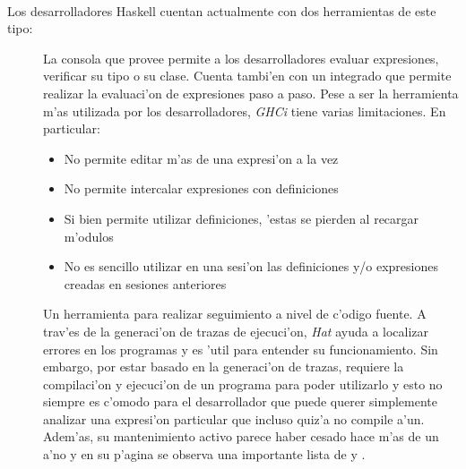 \documentclass[a4paper]{article}
\begin{document}
\paragraph{}Los desarrolladores Haskell cuentan actualmente con dos herramientas de este tipo:
\begin{description}
	\item[]
		La consola que provee  permite a los desarrolladores evaluar expresiones, verificar su tipo o su clase.  Cuenta tambi'en con un  integrado que permite realizar la evaluaci'on de expresiones paso a paso.  Pese a ser la herramienta m'as utilizada por los desarrolladores, \textit{GHCi} tiene varias limitaciones.  En particular:
		\begin{itemize}
			\item No permite editar m'as de una expresi'on a la vez
			\item No permite intercalar expresiones con definiciones
			\item	Si bien permite utilizar definiciones, 'estas se pierden al recargar m'odulos
			\item No es sencillo utilizar en una sesi'on las definiciones y/o expresiones creadas en sesiones anteriores
		\end{itemize}
	\item[]
		Un herramienta para realizar seguimiento a nivel de c'odigo fuente.  A trav'es de la generaci'on de trazas de ejecuci'on, \textit{Hat} ayuda a localizar errores en los programas y es 'util para entender su funcionamiento.  Sin embargo, por estar basado en la generaci'on de trazas, requiere la compilaci'on y ejecuci'on de un programa para poder utilizarlo y esto no siempre es c'omodo para el desarrollador que puede querer simplemente analizar una expresi'on particular que incluso quiz'a no compile a'un.  Adem'as, su mantenimiento activo parece haber cesado hace m'as de un a'no y en su p'agina se observa una importante lista de  y .  
\end{description}

\end{document}
